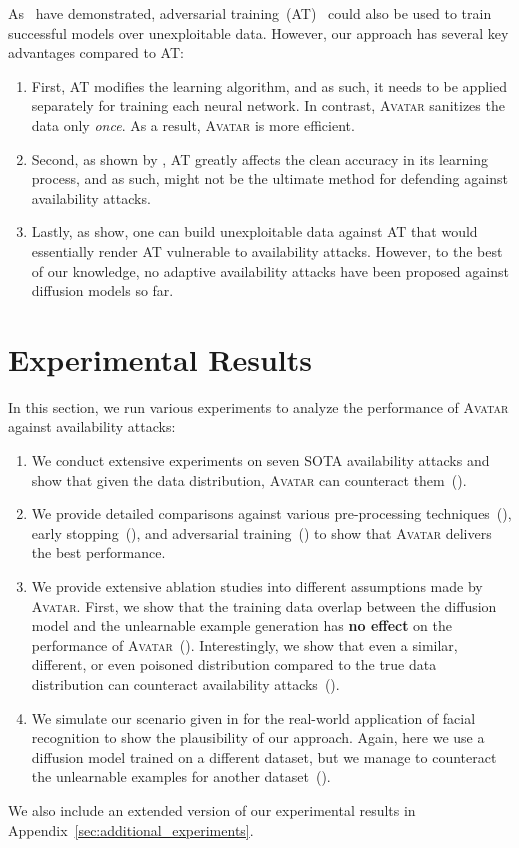 \documentclass[conference]{IEEEtran}
\theoremstyle{definition}
\theoremstyle{remark}
\theoremstyle{proposition}
\begin{document}
As~\citet{tao2021preventing} have demonstrated, adversarial training~(AT)~\citep{madry2018towards} could also be used to train successful models over unexploitable data.
However, our approach has several key advantages compared to AT:
\begin{enumerate}[1)]\setlength\itemsep{-0.5pt}
        \item First, AT modifies the learning algorithm, and as such, it needs to be applied separately for training each neural network.
        In contrast, \textsc{Avatar} sanitizes the data only \textit{once}.
        As a result, \textsc{Avatar} is more efficient.
        \item Second, as shown by \citet{tsipras2019robustness}, AT greatly affects the clean accuracy in its learning process, and as such, might not be the ultimate method for defending against availability attacks.
        \item Lastly, as \citet{fu2022remn} show, one can build unexploitable data against AT that would essentially render AT vulnerable to availability attacks. However, to the best of our knowledge, no adaptive availability attacks have been proposed against diffusion models so far.
\end{enumerate}

\section{Experimental Results}\label{sec:experiments}
In this section, we run various experiments to analyze the performance of \textsc{Avatar} against availability attacks:
\begin{enumerate}
    \item We conduct extensive experiments on seven SOTA availability attacks and show that given the data distribution, \textsc{Avatar} can counteract them~().
    \item We provide detailed comparisons against various pre-processing techniques~(), early stopping~(), and adversarial training~() to show that \textsc{Avatar} delivers the best performance.
    \item We provide extensive ablation studies into different assumptions made by \textsc{Avatar}.
    First, we show that the training data overlap between the diffusion model and the unlearnable example generation has \textbf{no effect} on the performance of \textsc{Avatar}~(). Interestingly, we show that even a similar, different, or even poisoned distribution compared to the true data distribution can counteract availability attacks~().
    \item We simulate our scenario given in  for the real-world application of facial recognition to show the plausibility of our approach. Again, here we use a diffusion model trained on a different dataset, but we manage to counteract the unlearnable examples for another dataset~().
\end{enumerate}
We also include an extended version of our experimental results in Appendix~\ref{sec:additional_experiments}.
\end{document}
